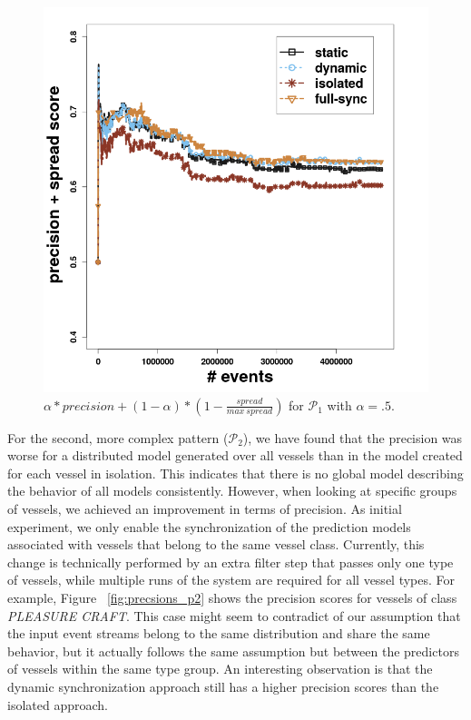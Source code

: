 \begin{center}
	
	\begin{figure}[H]
		
		\includegraphics[width=\textwidth,height=.62\textheight]{chapters/figures/synopses/p1_new_score_100_2_08.png}
		
		\caption{$ \alpha * precision + (1 - \alpha ) * ( 1- \frac{spread}{max\  spread})$ for $\mathcal{P}_1$ with $\alpha = .5$.}
		\label{fig:spread_prec}
	\end{figure}
\end{center}


\par For the second, more complex pattern ($\mathcal{P}_2$), we have found that the precision was worse for a distributed model generated over all vessels than in the model created for each vessel in isolation. This indicates that there is no global model describing the behavior of all models consistently. However, when looking at specific groups of vessels, we achieved an improvement in terms of precision. As initial experiment, we only enable the synchronization of the prediction models associated with vessels that belong to the same vessel class. Currently, this change is technically performed by an extra filter step that passes only one type of vessels, while multiple runs of the system are required for all vessel types. For example, Figure ~\ref{fig:precsions_p2} shows the precision scores for vessels of class \textit{PLEASURE CRAFT}. This case might seem to contradict of our assumption that the input event streams belong to the same distribution and share the same behavior, but it actually follows the same assumption but between the predictors of vessels within the same type group. An interesting observation is that the dynamic synchronization approach still has a higher precision scores than the isolated approach.

